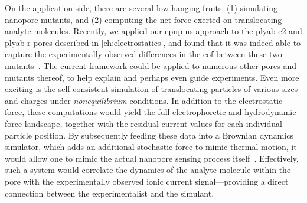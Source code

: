 On the application side, there are several low hanging fruits: (1) simulating nanopore mutants, and (2)
computing the net force exerted on translocating analyte molecules. Recently, we applied our \gls{epnp-ns}
approach to the \gls{plyab-e2} and \gls{plyab-r} pores described in \cref{ch:electrostatics}, and found that
it was indeed able to capture the experimentally observed differences in the \gls{eof} between these two
mutants~\cite{Huang-2020}. The current framework could be applied to numerous other pores and mutants thereof,
to help explain and perhaps even guide experiments. Even more exciting is the self-consistent simulation of
translocating particles of various sizes and charges under \emph{nonequilibrium} conditions. In addition to
the electrostatic force, these computations would yield the full electrophoretic and hydrodynamic force
landscape, together with the residual current values for each individual particle position. By subsequently
feeding these data into a Brownian dynamics simulator, which adds an additional stochastic force to mimic
thermal motion, it would allow one to mimic the actual nanopore sensing process
itself~\cite{Pederson-2015,Hulings-2018}. Effectively, such a system would correlate the dynamics of the
analyte molecule within the pore with the experimentally observed ionic current signal---providing a direct
connection between the experimentalist and the simulant.


\instructionsconclusions


\cleardoublepage

